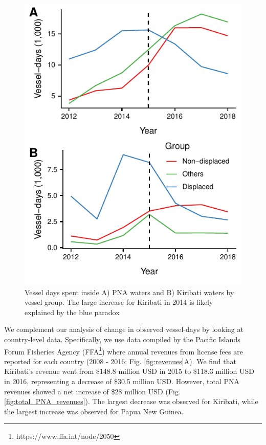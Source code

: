 \documentclass[9p,twocolumn,twoside,lineno]{pnas-new}
\begin{document}
\begin{figure}[ht]
\centering
	\includegraphics{img/included_PS_VDS_year_DiD.pdf}
	\caption{\label{fig:included_PS_VDS_year_DiD}Vessel days spent inside A) PNA waters and B) Kiribati waters by vessel group. The large increase for Kiribati in 2014 is likely explained by the blue paradox \cite{mcdermott_2018}}
\end{figure}

We complement our analysis of change in observed vessel-days by looking at country-level data. Specifically, we use data compiled by the Pacific Islands Forum Fisheries Agency (FFA\footnote{https://www.ffa.int/node/2050}) where annual revenues from license fees are reported for each country (2008 - 2016; Fig. \ref{fig:revenues}A). We find that Kiribati's revenue went from \$148.8 million USD in 2015 to \$118.3 million USD in 2016, representing a decrease of \$30.5 million USD. However, total PNA revenues showed a net increase of \$28 million USD (Fig. \ref{fig:total_PNA_revenues}). The largest decrease was observed for Kiribati, while the largest increase was observed for Papua New Guinea.
\end{document}
